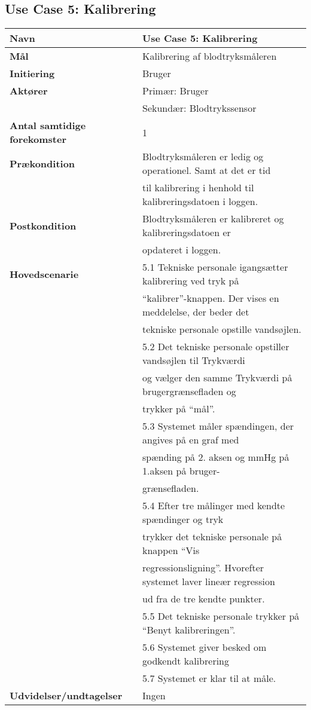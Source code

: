 \subsection{Use Case 5: Kalibrering}
\vspace{0.8 cm}
\begin{table}[h!]
	\begin{tabular}{l|l}
		\rowcolor[HTML]{A9D9F9} 
		\textbf{Navn} & Use Case 5: Kalibrering \\
		\hline
		\textbf{Mål} & Kalibrering af blodtryksmåleren \\
		\hline
		\rowcolor[HTML]{A9D9F9} 
		\textbf{Initiering} & Bruger \\
		\hline
		\textbf{Aktører} & Primær: Bruger \\
		\textbf{} & Sekundær: Blodtrykssensor \\
		\hline
		\rowcolor[HTML]{A9D9F9} 
		\textbf{Antal samtidige forekomster} & 1 \\
		\hline
		\textbf{Prækondition} & Blodtryksmåleren er ledig og operationel. Samt at det er tid \\
		\textbf{} & til kalibrering i henhold til kalibreringsdatoen i loggen. \\
		\hline
		\rowcolor[HTML]{A9D9F9} 
		\textbf{Postkondition} & Blodtryksmåleren er kalibreret og kalibreringsdatoen er \\
		\rowcolor[HTML]{A9D9F9} 
		\textbf{} & opdateret i loggen. \\
		\hline
		\textbf{Hovedscenarie} & 5.1 Tekniske personale igangsætter kalibrering ved tryk på \\
		& “kalibrer”-knappen. Der vises en meddelelse, der beder det \\
		& tekniske personale opstille vandsøjlen. \\
		& 5.2 Det tekniske personale opstiller vandsøjlen til Trykværdi \\
		& og vælger den samme Trykværdi på brugergrænsefladen og \\
		& trykker på “mål”. \\
		& 5.3 Systemet måler spændingen, der angives på en graf med \\
		& spænding på 2. aksen og mmHg på 1.aksen på bruger- \\
		& grænsefladen. \\
		& 5.4 Efter tre målinger med kendte spændinger og tryk \\
		& trykker det tekniske personale på knappen “Vis \\
		& regressionsligning”. Hvorefter systemet laver lineær regression  \\
		& ud fra de tre kendte punkter. \\
		& 5.5 Det tekniske personale trykker på “Benyt kalibreringen”. \\
		& 5.6 Systemet giver besked om godkendt kalibrering \\
		& 5.7 Systemet er klar til at måle. \\
		\hline
		\rowcolor[HTML]{A9D9F9} 
		\textbf{Udvidelser/undtagelser} & Ingen
	\end{tabular}
\end{table}